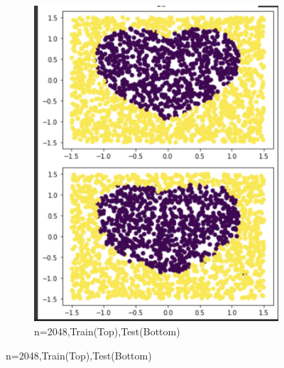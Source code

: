 \documentclass[a4paper]{article}
\theoremstyle{definition}
\newenvironment{soln}{
    \leavevmode\color{blue}\ignorespaces
}{}
\begin{document}
\begin{soln}
\begin{figure}[H]
\begin{subfigure}{0.5\textwidth}
            \includegraphics[scale=0.5]{sk2048.png}
            \caption{n=2048,Train(Top),Test(Bottom)}
            \label{fig:q2}
        \end{subfigure}
        \end{figure} 
        \begin{figure}[H]
            \centering

\end{figure}
\end{soln}
\end{document}
